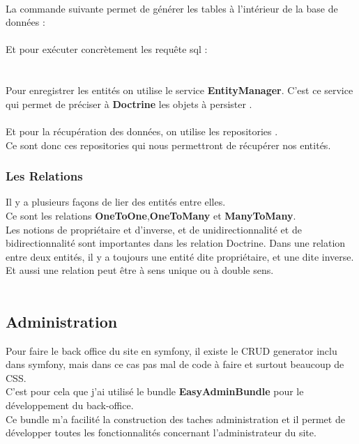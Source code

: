 \documentclass[12pt]{article}
\begin{document}
\\ 

La commande suivante permet de générer les tables à l'intérieur de la base de données :\\
\\
Et pour exécuter concrètement les requête sql :\\
\\ \\

Pour enregistrer les entités on utilise le service \textbf{EntityManager}. 
 C'est ce service qui permet de préciser à  \textbf{Doctrine} les objets à persister .\\
 
\\

Et pour la récupération des données, on utilise les repositories .\\
Ce sont donc ces repositories qui nous permettront de récupérer nos entités. \\


\subsubsection{Les Relations}
Il y a plusieurs façons de lier des entités entre elles. \\
 Ce sont les relations \textbf{OneToOne},\textbf{OneToMany} et \textbf{ManyToMany}. \\
 Les notions de propriétaire et d'inverse, et de  unidirectionnalité et de bidirectionnalité sont  importantes dans les relation Doctrine. Dans une relation entre deux entités, il y a toujours une entité dite propriétaire, et une dite inverse.\\ 
 Et aussi  une relation peut être à sens unique ou à double sens.\\ \\





\subsection{Administration}



 Pour faire le back office du site en symfony, il existe  le CRUD generator inclu dans symfony, mais dans ce cas pas mal de code à faire et surtout beaucoup de CSS.\\
 C'est pour cela que j'ai utilisé le bundle \textbf{EasyAdminBundle} pour le développement du back-office.\\
 Ce bundle m'a facilité la construction des taches administration et il permet de développer toutes les 
 fonctionnalités concernant  l'administrateur du site.\\ \\
 
\end{document}
